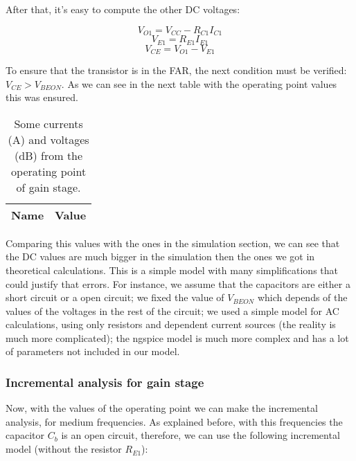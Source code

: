 \par After that, it's easy to compute the other DC voltages:

\begin{equation}
V_{O1}=V_{CC}-R_{C1}I_{C1}
\end{equation}
\begin{equation}
V_{E1}=R_{E1}I_{E1}
\end{equation}
\begin{equation}
V_{CE}=V_{O1}-V_{E1}
\end{equation}
\par To ensure that the transistor is in the FAR, the next condition must be verified: $V_{CE}>V_{BEON}$. As we can see in the next table with the operating point values this was ensured.

\begin{table}[H]
    \centering
    \begin{tabular}{|l|r|}
    \hline    
    {\bf Name} & {\bf Value} \\ \hline
    
    \end{tabular}
     \caption{Some currents (A) and voltages (dB) from the operating point of gain stage.}
    \label{tab:op1}
  \end{table}

\par Comparing this values with the ones in the simulation section, we can see that the DC values are much bigger in the simulation then the ones we got in theoretical calculations. This is a simple model with many simplifications that could justify that errors. For instance, we assume that the capacitors are either a short circuit or a open circuit; we fixed the value of $V_{BEON}$ which depends of the values of the voltages in the rest of the circuit; we used a simple model for AC calculations, using only resistors and dependent current sources (the reality is much more complicated); the ngspice model is much more complex and has a lot of parameters not included in our model. 


\subsubsection{Incremental analysis for gain stage}
\label{subsec:inc1}

\par Now, with the values of the operating point we can make the incremental analysis, for medium frequencies. As explained before, with this frequencies the capacitor $C_b$ is an open circuit, therefore, we can use the following incremental model (without the resistor $R_{E1}$):

